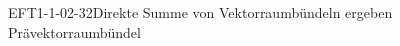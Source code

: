 
\begin{KORO}{EFT1-1-02-32}{Direkte Summe von Vektorraumbündeln ergeben Prävektorraumbündel}
\end{KORO}
